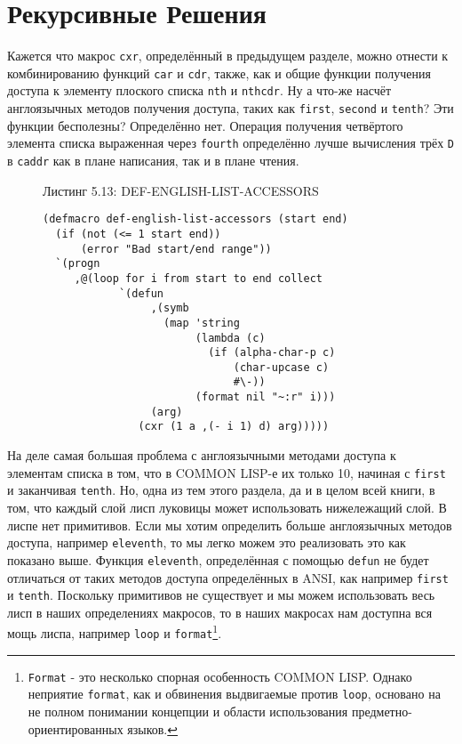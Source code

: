 \section{Рекурсивные Решения}\label{section_recursive_solutions}

Кажется что макрос \verb"cxr", определённый в предыдущем разделе, можно отнести к комбинированию функций \verb"car" и \verb"cdr", также, как и общие функции получения доступа к элементу плоского списка \verb"nth" и \verb"nthcdr". Ну а что-же насчёт англоязычных методов получения доступа, таких как \verb"first", \verb"second" и \verb"tenth"? Эти функции бесполезны? Определённо нет. Операция получения четвёртого элемента списка выраженная через \verb"fourth" определённо лучше вычисления трёх \verb"D" в \verb"caddr" как в плане написания, так и в плане чтения.

\begin{figure}Листинг 5.13: DEF-ENGLISH-LIST-ACCESSORS\label{listing_5.13}
\listbegin
\begin{verbatim}
(defmacro def-english-list-accessors (start end)
  (if (not (<= 1 start end))
      (error "Bad start/end range"))
  `(progn
     ,@(loop for i from start to end collect
            `(defun
                 ,(symb
                   (map 'string
                        (lambda (c)
                          (if (alpha-char-p c)
                              (char-upcase c)
                              #\-))
                        (format nil "~:r" i)))
                 (arg)
               (cxr (1 a ,(- i 1) d) arg)))))
\end{verbatim}
\listend
\end{figure}

На деле самая большая проблема с англоязычными методами доступа к элементам списка в том, что в COMMON LISP-е их только 10, начиная с \verb"first" и заканчивая \verb"tenth". Но, одна из тем этого раздела, да и в целом всей книги, в том, что каждый слой лисп луковицы может использовать нижележащий слой. В лиспе нет примитивов. Если мы хотим определить больше англоязычных методов доступа, например \verb"eleventh", то мы легко можем это реализовать это как показано выше. Функция \verb"eleventh", определённая с помощью \verb"defun" не будет отличаться от таких методов доступа определённых в ANSI, как например \verb"first" и \verb"tenth". Поскольку примитивов не существует и мы можем использовать весь лисп в наших определениях макросов, то в наших макросах нам доступна вся мощь лиспа, например \verb"loop" и \verb"format"\footnote{\verb"Format" - это несколько спорная особенность COMMON LISP. Однако неприятие \verb"format", как и обвинения выдвигаемые против \verb"loop", основано на не полном понимании концепции и области использования предметно-ориентированных языков.}.



